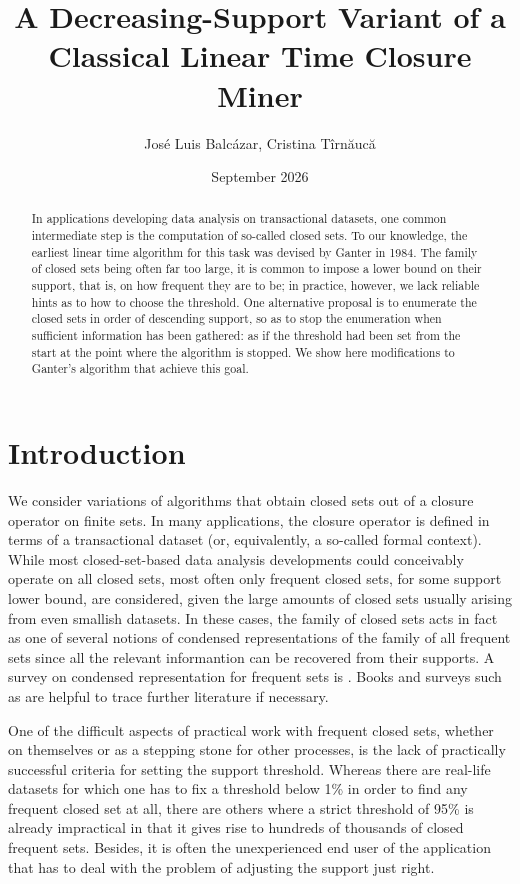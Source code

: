 \documentclass{article}
\title{A Decreasing-Support Variant of a Classical Linear Time Closure Miner}
\author{Jos\'e Luis Balc\'azar, Cristina T\^irn\u{a}uc\u{a}}
\date{September 2026}
\begin{document}
\maketitle

\begin{abstract}
In applications developing data analysis on 
transactional datasets, one common intermediate 
step is the computation of so-called closed sets. 
To our knowledge, the earliest linear time algorithm
for this task was devised by Ganter in 1984.
The family of closed sets being often far too large, 
it is common to impose a lower bound on their support, 
that is, on how frequent they are to be; in practice, 
however, we lack reliable hints as to how to choose 
the threshold.
One alternative proposal is to enumerate the 
closed sets in order of descending support, 
so as to stop the enumeration when sufficient 
information has been gathered: as if the threshold 
had been set from the start at the point where the 
algorithm is stopped.
We show here modifications to Ganter's algorithm that 
achieve this goal.
\end{abstract}


\section{Introduction}
\label{sec:Intro}


We consider variations of algorithms that obtain closed 
sets out of a closure operator on finite sets. In many
applications, the closure operator is defined in terms
of a transactional dataset (or, equivalently, a so-called
formal context). While most closed-set-based data analysis 
developments could conceivably operate on all closed sets, 
most often only frequent closed sets, for some support
lower bound, are considered, given the large amounts of 
closed sets usually arising from even smallish datasets. 
In these cases, the family of closed sets acts in fact
as one of several notions of condensed representations 
of the family of all frequent sets since all the relevant
informantion can be recovered from their supports.
A survey on condensed representation for frequent sets 
is \cite{CaRiBo05}. Books and surveys such as 
\cite{CegRod06,GanWil99,GenHam06} 
are helpful to trace further literature if necessary.

One of the difficult aspects of practical work with frequent
closed sets, whether on themselves or as a stepping stone
for other processes, is the lack of practically successful
criteria for setting the support threshold. Whereas there 
are real-life datasets for which one has to fix a threshold 
below 1\% in order to find any frequent closed set at all, there are 
others where a strict threshold of 95\% is already impractical 
in that it gives rise to hundreds of thousands of closed 
frequent sets. Besides, it is often the unexperienced end user 
of the application that has to deal with the problem of adjusting 
the support just right. 
\end{document}
